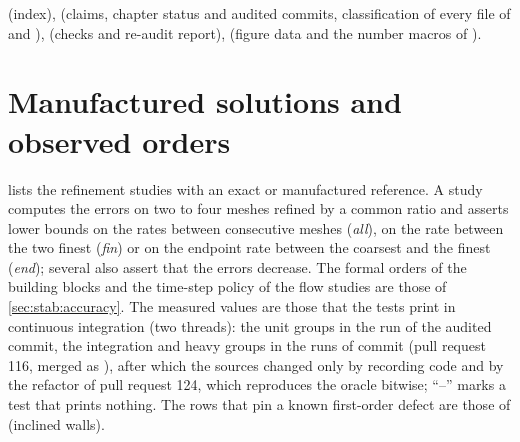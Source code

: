 \begin{implnote}
 (index), 
(claims, chapter status and audited commits, classification of every file of
 and ),  (checks and
re-audit report),  (figure data and
the number macros of ).
\end{implnote}

\section{Manufactured solutions and observed orders}\label{sec:verif:orders}
 lists the refinement studies with an exact or
manufactured reference. A study computes the errors on two to four meshes
refined by a common ratio and asserts lower bounds on the rates between
consecutive meshes (\emph{all}), on the rate between the two finest
(\emph{fin}) or on the endpoint rate between the coarsest and the finest
(\emph{end}); several also assert that the errors decrease. The formal orders
of the building blocks and the time-step policy of the flow studies are those
of \cref{sec:stab:accuracy}. The measured values are those that the tests
print in continuous integration (two threads): the unit groups in the run of
the audited commit, the integration and heavy groups in the runs of commit
 (pull request 116, merged as ), after which the
sources changed only by recording code and by the refactor of pull request
124, which reproduces the oracle bitwise; ``--'' marks a test that prints
nothing. The rows that pin a known first-order defect are those of
 (inclined walls).

